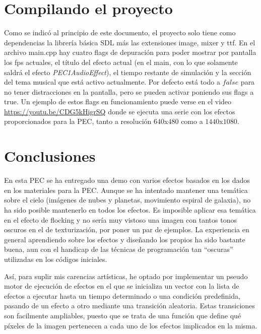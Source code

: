 \documentclass[12pt]{article}%
\begin{document}
\section{Compilando el proyecto}
	Como se indicó al principio de este documento, el proyecto solo tiene como dependencias la librería básica SDL más las extensiones image, mixer y ttf. En el archivo main.cpp hay cuatro flags de depuración para poder mostrar por pantalla los fps actuales, el título del efecto actual (en el main, con lo que solamente saldrá el efecto \textit{PEC1AudioEffect}), el tiempo restante de simulación y la sección del tema musical que está activo actualmente. Por defecto está todo a $false$ para no tener distracciones en la pantalla, pero se pueden activar poniendo sus flags a true. Un ejemplo de estos flags en funcionamiento puede verse en el video \url{https://youtu.be/CDG5kHigrSQ} donde se ejecuta una serie con los efectos proporcionados para la PEC, tanto a resolución $640$x$480$ como a $1440$x$1080$.
	
\section{Conclusiones}
	En esta PEC se ha entregado una demo con varios efectos basados en los dados en los materiales para la PEC. Aunque se ha intentado mantener una temática sobre el cielo (imágenes de nubes y planetas, movimiento espiral de galaxia), no ha sido posible mantenerlo en todos los efectos. Es imposible aplicar esa temática en el efecto de flocking y no sería muy vistoso una imagen con tantos tonos oscuros en el de texturización, por poner un par de ejemplos. La experiencia en general aprendiendo sobre los efectos y diseñando los propios ha sido bastante buena, aun con el handicap de las técnicas de programación tan ``oscuras'' utilizadas en los códigos iniciales.
	
	Así, para suplir mis carencias artísticas, he optado por implementar un pseudo motor de ejecución de efectos en el que se inicializa un vector con la lista de efectos a ejecutar hasta un tiempo determinado o una condición predefinida, pasando de un efecto a otro mediante una transición aleatoria. Estas transiciones son facilmente ampliables, puesto que se trata de una función que define qué píxeles de la imagen pertenecen a cada uno de los efectos implicados en la misma.
	
	
\end{document}
